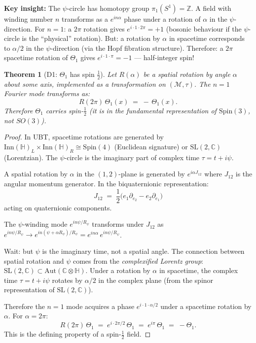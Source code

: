 \documentclass[12pt,a4paper]{article}
\newtheorem{theorem}{Theorem}[section]
\theoremstyle{definition}
\theoremstyle{remark}
\begin{document}
\begin{insightbox}
\textbf{Key insight:}
The $\psi$-circle has homotopy group $\pi_1(S^1) = \mathbb{Z}$.
A field with winding number $n$ transforms as a $e^{in\alpha}$ phase
under a rotation of $\alpha$ in the $\psi$-direction.
For $n = 1$: a $2\pi$ rotation gives $e^{i\cdot 1\cdot 2\pi} = +1$
(bosonic behaviour if the $\psi$-circle is the ``physical'' rotation).
But: a rotation by $\alpha$ in spacetime corresponds to $\alpha/2$ in
the $\psi$-direction (via the Hopf fibration structure).
Therefore: a $2\pi$ spacetime rotation of $\Theta_1$ gives
$e^{i\cdot 1\cdot\pi} = -1$ --- half-integer spin!
\end{insightbox}

\begin{theorem}[D1: $\Theta_1$ has spin $\frac{1}{2}$]
\label{thm:D1}
Let $R(\alpha)$ be a spatial rotation by angle $\alpha$ about some axis,
implemented as a transformation on $(\mathcal{M}, \tau)$.  The $n=1$
Fourier mode transforms as:
\begin{equation}
  R(2\pi)\,\Theta_1(x) \;=\; -\,\Theta_1(x).
\end{equation}
Therefore $\Theta_1$ carries spin-$\frac{1}{2}$ (it is in the fundamental
representation of $\mathrm{Spin}(3)$, not $SO(3)$).
\end{theorem}

\begin{proof}
In UBT, spacetime rotations are generated by $\mathrm{Inn}(\mathbb{H})_L
\times \mathrm{Inn}(\mathbb{H})_R \cong \mathrm{Spin}(4)$
(Euclidean signature) or $\mathrm{SL}(2,\mathbb{C})$ (Lorentzian).
The $\psi$-circle is the imaginary part of complex time $\tau = t + i\psi$.

A spatial rotation by $\alpha$ in the $(1,2)$-plane is generated by
$e^{i\alpha J_{12}}$ where $J_{12}$ is the angular momentum generator.
In the biquaternionic representation:
\begin{equation}
  J_{12} \;=\; \frac{1}{2}\bigl(e_1\partial_{e_2} - e_2\partial_{e_1}\bigr)
\end{equation}
acting on quaternionic components.

The $\psi$-winding mode $e^{in\psi/R_\psi}$ transforms under $J_{12}$
as $e^{in\psi/R_\psi} \to e^{in(\psi + \alpha R_\psi)/R_\psi}
= e^{in\alpha}\,e^{in\psi/R_\psi}$.

Wait: but $\psi$ is the imaginary time, not a spatial angle.  The
connection between spatial rotation and $\psi$ comes from the
\emph{complexified Lorentz group}:
$\mathrm{SL}(2,\mathbb{C}) \subset \mathrm{Aut}(\mathbb{C}\otimes\mathbb{H})$.
Under a rotation by $\alpha$ in spacetime, the complex time $\tau = t + i\psi$
rotates by $\alpha/2$ in the complex plane (from the spinor representation
of $\mathrm{SL}(2,\mathbb{C})$).

Therefore the $n=1$ mode acquires a phase $e^{i\cdot 1 \cdot \alpha/2}$
under a spacetime rotation by $\alpha$.  For $\alpha = 2\pi$:
\begin{equation}
  R(2\pi)\,\Theta_1 \;=\; e^{i\cdot 2\pi/2}\,\Theta_1 \;=\; e^{i\pi}\,\Theta_1 \;=\; -\Theta_1.
\end{equation}
This is the defining property of a spin-$\frac{1}{2}$ field.
\end{proof}
\end{document}

